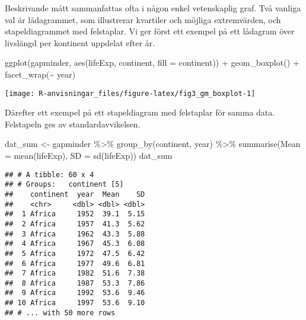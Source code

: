 \documentclass[
]{book}
\newenvironment{Shaded}{\begin{snugshade}}{\end{snugshade}}
\newcommand{\AttributeTok}[1]{\textcolor[rgb]{0.77,0.63,0.00}{#1}}
\newcommand{\FunctionTok}[1]{\textcolor[rgb]{0.00,0.00,0.00}{#1}}
\newcommand{\NormalTok}[1]{#1}
\newcommand{\OtherTok}[1]{\textcolor[rgb]{0.56,0.35,0.01}{#1}}
\newcommand{\SpecialCharTok}[1]{\textcolor[rgb]{0.00,0.00,0.00}{#1}}
\theoremstyle{definition}
\theoremstyle{definition}
\theoremstyle{definition}
\theoremstyle{definition}
\theoremstyle{remark}
\begin{document}
Beskrivande mått sammanfattas ofta i någon enkel vetenskaplig graf. Två vanliga val är lådagrammet, som illustrerar kvartiler och möjliga extremvärden, och stapeldiagrammet med felstaplar. Vi ger först ett exempel på ett lådagram över livslängd per kontinent uppdelat efter år.

\begin{Shaded}
\begin{Highlighting}[]
\FunctionTok{ggplot}\NormalTok{(gapminder, }\FunctionTok{aes}\NormalTok{(lifeExp, continent, }\AttributeTok{fill =}\NormalTok{ continent)) }\SpecialCharTok{+}
  \FunctionTok{geom\_boxplot}\NormalTok{() }\SpecialCharTok{+}
  \FunctionTok{facet\_wrap}\NormalTok{(}\SpecialCharTok{\textasciitilde{}}\NormalTok{ year)}
\end{Highlighting}
\end{Shaded}

\begin{center}\texttt{[image: R-anvisningar\_files/figure-latex/fig3\_gm\_boxplot-1]} \end{center}

Därefter ett exempel på ett stapeldiagram med felstaplar för samma data. Felstapeln ges av standardavvikelsen.

\begin{Shaded}
\begin{Highlighting}[]
\NormalTok{dat\_sum }\OtherTok{\textless{}{-}}\NormalTok{ gapminder }\SpecialCharTok{\%\textgreater{}\%} 
  \FunctionTok{group\_by}\NormalTok{(continent, year) }\SpecialCharTok{\%\textgreater{}\%} 
  \FunctionTok{summarise}\NormalTok{(}\AttributeTok{Mean =} \FunctionTok{mean}\NormalTok{(lifeExp),}
            \AttributeTok{SD =} \FunctionTok{sd}\NormalTok{(lifeExp))}
\NormalTok{dat\_sum}
\end{Highlighting}
\end{Shaded}

\begin{verbatim}
## # A tibble: 60 x 4
## # Groups:   continent [5]
##    continent  year  Mean    SD
##    <chr>     <dbl> <dbl> <dbl>
##  1 Africa     1952  39.1  5.15
##  2 Africa     1957  41.3  5.62
##  3 Africa     1962  43.3  5.88
##  4 Africa     1967  45.3  6.08
##  5 Africa     1972  47.5  6.42
##  6 Africa     1977  49.6  6.81
##  7 Africa     1982  51.6  7.38
##  8 Africa     1987  53.3  7.86
##  9 Africa     1992  53.6  9.46
## 10 Africa     1997  53.6  9.10
## # ... with 50 more rows
\end{verbatim}
\end{document}

